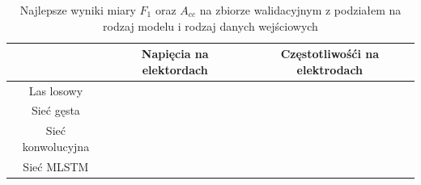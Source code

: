 \documentclass{./assets/wfis}
\begin{document}
\begin{table}[h]
    \centering
    \begin{tabular}{|c|c|c|}
        \hline
                 & Napięcia na elektordach & Częstotliwośći na elektrodach  \\
        \hline
        Las losowy &  &  \\
        Sieć gęsta &  & \\
        Sieć konwolucyjna & & \\
        Sieć MLSTM & & \\
        \hline
    \end{tabular}
    \caption{Najlepsze wyniki miary $F_1$ oraz $A_{cc}$ na zbiorze walidacyjnym z podziałem na rodzaj modelu i rodzaj danych wejściowych}
    \label{tab:high-level-results}
\end{table}
\end{document}
